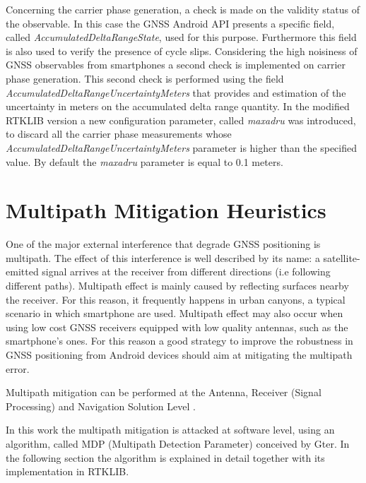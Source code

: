 Concerning the carrier phase generation, a check is made on the validity status of the observable. In this case the GNSS 
Android API presents a specific field, called \textit{AccumulatedDeltaRangeState}, used for this purpose. Furthermore this field is also used to verify the presence of cycle slips. Considering the high noisiness of GNSS observables from smartphones a second check is implemented on carrier phase generation. This second check is performed using the field \textit{AccumulatedDeltaRangeUncertaintyMeters} that provides and estimation of the uncertainty in meters on the accumulated delta range quantity. In the modified RTKLIB version a new configuration parameter, called \textit{maxadru} was introduced, to discard all the carrier phase measurements whose \textit{AccumulatedDeltaRangeUncertaintyMeters} parameter is higher than the specified value. By default the \textit{maxadru} parameter is equal to 0.1 meters.
%
\section{Multipath Mitigation Heuristics}
One of the major external interference that degrade GNSS 
positioning is multipath. The effect of this interference is well described by its name: a satellite-emitted signal arrives at the
receiver from different directions (i.e following different paths). Multipath effect is mainly caused by reflecting surfaces
nearby the receiver. For this reason, it frequently happens  in urban canyons, a typical scenario in which smartphone are used.
Multipath effect may also occur when using low cost GNSS receivers equipped with low quality antennas, such as the smartphone's ones. For this reason a good strategy to improve the robustness in GNSS positioning from Android devices should aim at mitigating the multipath error. 

Multipath mitigation can be performed at the Antenna, Receiver (Signal Processing) and Navigation Solution Level \cite{Bhuiyan:2010}. 


In this work the multipath mitigation is attacked at software level, using an algorithm, called MDP (Multipath Detection Parameter) conceived by Gter. In the following section the algorithm is explained in detail together with its implementation in RTKLIB.
